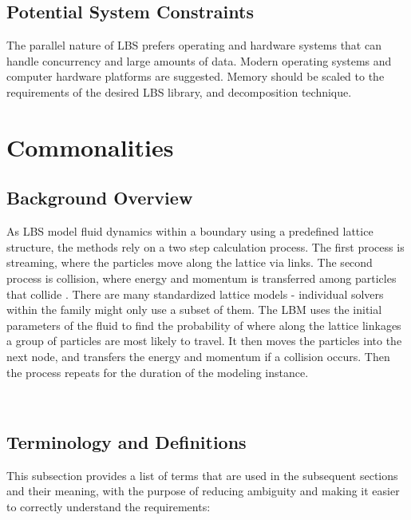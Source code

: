 \documentclass[12pt]{article}
\begin{document}
\subsection{Potential System Constraints}
\label{systemconstraints}

The parallel nature of LBS prefers operating and hardware systems that can handle concurrency and large amounts of data. Modern operating systems and computer hardware platforms are suggested. Memory should be scaled to the requirements of the desired LBS library, and decomposition technique.

\section{Commonalities}

\subsection{Background Overview} \label{Sec_Background}

As LBS model fluid dynamics within a boundary using a predefined lattice structure, the methods rely on a two step calculation process. The first process is streaming, where the particles move along the lattice via links. The second process is collision, where energy and momentum is transferred among particles that collide \cite{bao2011lattice}.
There are many standardized lattice models - individual solvers within the family might only use a subset of them.
The LBM uses the initial parameters of the fluid to find the probability of where along the lattice linkages a group of particles are most likely to travel. It then moves the particles into the next node, and transfers the energy and momentum if a collision occurs. Then the process repeats for the duration of the modeling instance.

~\newpage

\subsection{Terminology and  Definitions}
\label{termdef}

This subsection provides a list of terms that are used in the subsequent
sections and their meaning, with the purpose of reducing ambiguity and making it
easier to correctly understand the requirements:
\end{document}
